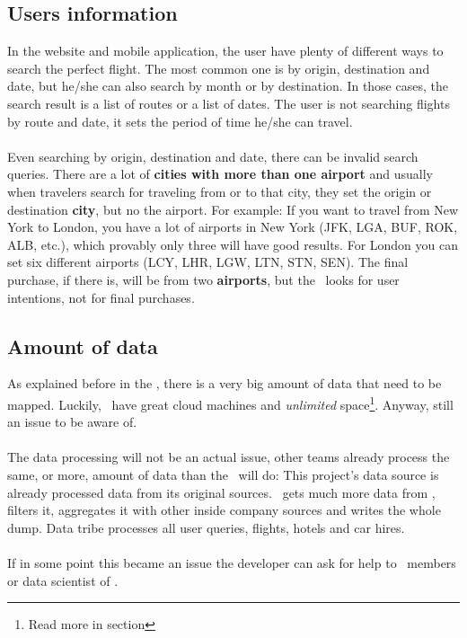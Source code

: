 \subsection{Users information}

In the website and mobile application, the user have plenty of different ways to search the perfect flight. The most common one is by origin, destination and date, but he/she can also search by month or by destination. In those cases, the search result is a list of routes or a list of dates. The user is not searching flights by route and date, it sets the period of time he/she can travel.
\\\\
Even searching by origin, destination and date, there can be invalid search queries. There are a lot of \textbf{cities with more than one airport} and usually when travelers search for traveling from or to that city, they set the origin or destination \textbf{city}, but no the airport. For example: If you want to travel from New York to London, you have a lot of airports in New York (JFK, LGA, BUF, ROK, ALB, etc.), which provably only three will have good results. For London you can set six different airports (LCY, LHR, LGW, LTN, STN, SEN). The final purchase, if there is, will be from two \textbf{airports}, but the \thesis\ looks for user intentions, not for final purchases.

\subsection{Amount of data}

As explained before in the , there is a very big amount of data that need to be mapped. Luckily, \company\ have great cloud machines and \textit{unlimited} space\footnote{Read more in section }. Anyway, still an issue to be aware of.
\\\\
The data processing will not be an actual issue, other teams already process the same, or more, amount of data than the \thesis\ will do: This project's data source is already processed data from its original sources. \squad\ gets much more data from , filters it, aggregates it with other inside company sources and writes the whole dump. Data tribe processes all user queries, flights, hotels and car hires.
\\\\
If in some point this became an issue the developer can ask for help to \squad\ members or data scientist of \company.

